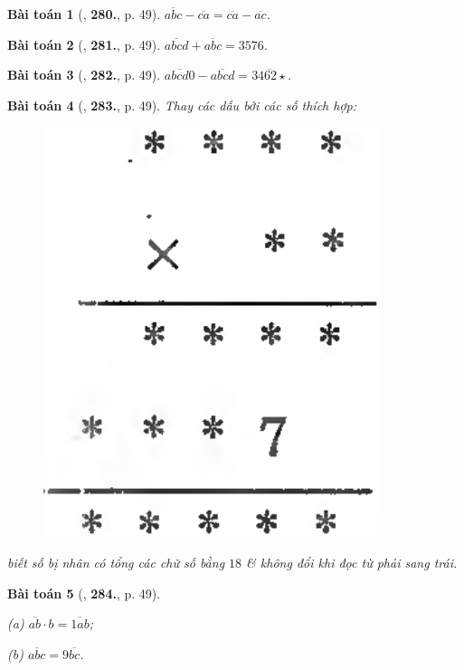 \documentclass{article}
\numberwithin{equation}{section}
\newtheorem{baitoan}{Bài toán}
\begin{document}
\begin{baitoan}[\cite{Binh_Toan_6_tap_1}, \textbf{280.}, p. 49]
	$\overline{abc} - \overline{ca} = \overline{ca} - \overline{ac}$.
\end{baitoan}

\begin{baitoan}[\cite{Binh_Toan_6_tap_1}, \textbf{281.}, p. 49]
	$\overline{abcd} + \overline{abc} = 3576$.
\end{baitoan}

\begin{baitoan}[\cite{Binh_Toan_6_tap_1}, \textbf{282.}, p. 49]
	$\overline{abcd0} - \overline{abcd} = \overline{3462\star}$.
\end{baitoan}

\begin{baitoan}[\cite{Binh_Toan_6_tap_1}, \textbf{283.}, p. 49]
	Thay các dấu {\bf*} bởi các số thích hợp:
	\begin{figure}[H]
		\centering
		\includegraphics[scale=0.13]{Binh_194_p_49}
	\end{figure}
	biết số bị nhân có tổng các chữ số bằng $18$ \& không đổi khi đọc từ phải sang trái.
\end{baitoan}

\begin{baitoan}[\cite{Binh_Toan_6_tap_1}, \textbf{284.}, p. 49]
	\begin{enumerate*}
		\item[(a)] $\overline{ab}\cdot b = \overline{1ab}$;
		\item[(b)] $\overline{abc} = 9\overline{bc}$.
	\end{enumerate*}
\end{baitoan}
\end{document}
